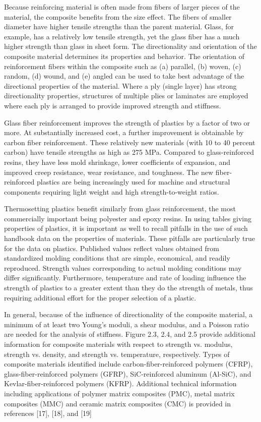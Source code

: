 \documentclass[
10pt,
a4paper,
openany,
svgnames,
]{book}
\begin{document}
Because reinforcing material is often made from fibers of larger pieces of the material, the composite benefits from the size effect. The fibers of smaller diameter have higher tensile strengths than the parent material. Glass, for example, has a relatively low tensile strength, yet the glass fiber has a much higher strength than glass in sheet form. The directionality and orientation of the composite material determines its properties and behavior. The orientation of reinforcement fibers within the composite such as (a) parallel, (b) woven, (c) random, (d) wound, and (e) angled can be used to take best advantage of the directional properties of the material. Where a ply (single layer) has strong directionality properties, structures of multiple plies or laminates are employed where each ply is arranged to provide improved strength and stiffness.

Glass fiber reinforcement improves the strength of plastics by a factor of two or more. At substantially increased cost, a further improvement is obtainable by carbon fiber reinforcement. These relatively new materials (with 10 to 40 percent carbon) have tensile strengths as high as 275 MPa. Compared to glass-reinforced resins, they have less mold shrinkage, lower coefficients of expansion, and improved creep resistance, wear resistance, and toughness. The new fiber-reinforced plastics are being increasingly used for machine and structural components requiring light weight and high strength-to-weight ratios.

Thermosetting plastics benefit similarly from glass reinforcement, the most commercially important being polyester and epoxy resins. In using tables giving properties of plastics, it is important as well to recall pitfalls in the use of such handbook data on the properties of materials. These pitfalls are particularly true for the data on plastics. Published values reflect values obtained from standardized molding conditions that are simple, economical, and readily reproduced. Strength values corresponding to actual molding conditions may differ significantly. Furthermore, temperature and rate of loading influence the strength of plastics to a greater extent than they do the strength of metals, thus requiring additional effort for the proper selection of a plastic.

In general, because of the influence of directionality of the composite material, a minimum of at least two Young’s moduli, a shear modulus, and a Poisson ratio are needed for the analysis of stiffness. Figure 2.3, 2.4, and 2.5 provide additional information for composite materials with respect to strength vs. modulus, strength vs. density, and strength vs. temperature, respectively. Types of composite materials identified include carbon-fiber-reinforced polymers (CFRP), glass-fiber-reinforced polymers (GFRP), SiC-reinforced aluminum (Al-SiC), and Kevlar-fiber-reinforced polymers (KFRP). Additional technical information including applications of polymer matrix composites (PMC), metal matrix composites (MMC) and ceramic matrix composites (CMC) is provided in references [17], [18], and [19]
\end{document}
